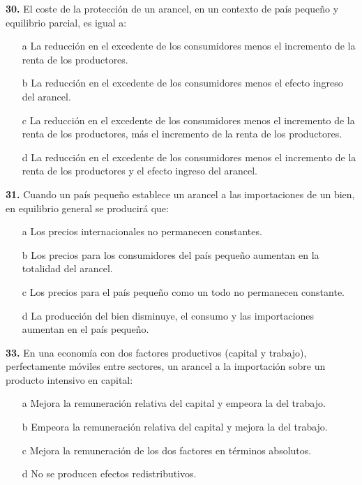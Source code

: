 \documentclass{nuevotema}
\begin{document}

\textbf{30.} El coste de la protección de un arancel, en un contexto de país pequeño y equilibrio parcial, es igual a:

\begin{itemize}
	\item[a] La reducción en el excedente de los consumidores menos el incremento de la renta de los productores.
	\item[b] La reducción en el excedente de los consumidores menos el efecto ingreso del arancel.
	\item[c] La reducción en el excedente de los consumidores menos el incremento de la renta de los productores, más el incremento de la renta de los productores.
	\item[d] La reducción en el excedente de los consumidores menos el incremento de la renta de los productores y el efecto ingreso del arancel.
\end{itemize}

\textbf{31.} Cuando un país pequeño establece un arancel a las importaciones de un bien, en equilibrio general se producirá que:

\begin{itemize}
	\item[a] Los precios internacionales no permanecen constantes.
	\item[b] Los precios para los consumidores del país pequeño aumentan en la totalidad del arancel.
	\item[c] Los precios para el país pequeño como un todo no permanecen constante.
	\item[d] La producción del bien disminuye, el consumo y las importaciones aumentan en el país pequeño.
\end{itemize}


\textbf{33.} En una economía con dos factores productivos (capital y trabajo), perfectamente móviles entre sectores, un arancel a la importación sobre un producto intensivo en capital:

\begin{itemize}
	\item[a] Mejora la remuneración relativa del capital y empeora la del trabajo.
	\item[b] Empeora la remuneración relativa del capital y mejora la del trabajo.
	\item[c] Mejora la remuneración de los dos factores en términos absolutos.
	\item[d] No se producen efectos redistributivos.
\end{itemize}
\end{document}
